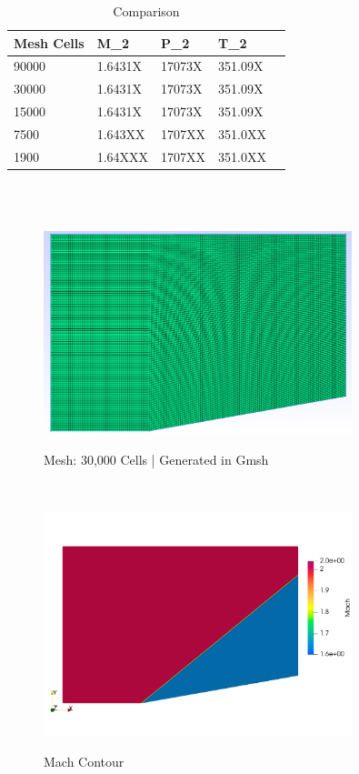 \begin{table}[ht]
    \centering
    \begin{tabular}{|l|l|l|l|l|}
    \hline
    Mesh Cells & M_2 & P_2 & T_2 \\
    \hline
    90000 & 1.6431X & 17073X & 351.09X \\
    \hline
    30000 & 1.6431X & 17073X & 351.09X \\
    \hline
    15000 & 1.6431X & 17073X & 351.09X \\
    \hline
    7500 & 1.643XX & 1707XX & 351.0XX \\
    \hline
    1900 & 1.64XXX & 1707XX & 351.0XX\\
    \hline
    \end{tabular}
    \caption{Comparison}
    \label{tab:Comparison}
\end{table}\\
\newpage
\\
\begin{figure}[H]
\centering
\includegraphics[width=0.8\textwidth]{text/inviscid_wedge_fine_mesh.png}\\
\caption[Inviscid Mesh]{Mesh: 30,000 Cells | Generated in Gmsh}
\label{fig1.1: Inviscid Mesh}
\end{figure}
\\
\begin{figure}[H]
\centering
\includegraphics[width=0.8\textwidth]{text/Mach_HLLC_Inviscid_Wedge.png}\\
\caption[Inviscid Mach Contour]{Mach Contour}
\label{fig: Inviscid Mach Contour}
\end{figure}

